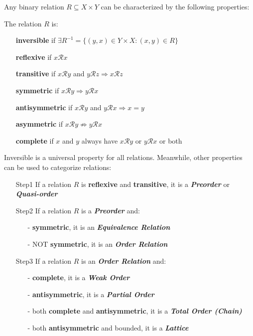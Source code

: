 Any binary relation $R\subseteq X\times Y$ can be characterized by the following properties:
\begin{definition}
    The relation $R$ is:
    \begin{enumerate}
        \item[\textbf{inversible}] if $\exists R^{-1}=\{(y,x)\in Y\times X:(x,y)\in R\}$
        \item[\textbf{reflexive}] if $x\mathcal{R}x$
        \item[\textbf{transitive}] if $x\mathcal{R}y$ and $y\mathcal{R}z \Rightarrow x\mathcal{R}z$
        \item[\textbf{symmetric}] if $x\mathcal{R}y\Rightarrow y\mathcal{R}x$
        \item[\textbf{antisymmetric}] if $x\mathcal{R}y$ and $y\mathcal{R}x \Rightarrow x=y$
        \item[\textbf{asymmetric}] if $x\mathcal{R}y \nRightarrow y\mathcal{R}x$
        \item[\textbf{complete}] if $x$ and $y$ always have $x\mathcal{R}y$ or $y\mathcal{R}x$ or both    
    \end{enumerate}
\end{definition}

Inversible is a universal property for all relations. Meanwhile, other properties can be used to categorize relations:
\begin{enumerate}
    \item[Step1] If a relation $R$ is \textbf{reflexive} and \textbf{transitive}, it is a \textbf{\textit{Preorder}} or \textbf{\textit{Quasi-order}}
    \item[Step2] If a relation $R$ is a \textbf{\textit{Preorder}} and:
    \begin{enumerate}
        \item[-] \textbf{symmetric}, it is an \textbf{\textit{Equivalence Relation}}
        \item[-] NOT \textbf{symmetric}, it is an \textbf{\textit{Order Relation}}  
    \end{enumerate}
    \item[Step3] If a relation $R$ is an \textbf{\textit{Order Relation}} and:
    \begin{enumerate}
        \item[-] \textbf{complete}, it is a \textbf{\textit{Weak Order}}
        \item[-] \textbf{antisymmetric}, it is a \textbf{\textit{Partial Order}}
        \item[-] both \textbf{complete} and \textbf{antisymmetric}, it is a \textbf{\textit{Total Order (Chain)}} 
        \item[-] both \textbf{antisymmetric} and bounded, it is a \textbf{\textit{Lattice}} 
    \end{enumerate} 
\end{enumerate}

